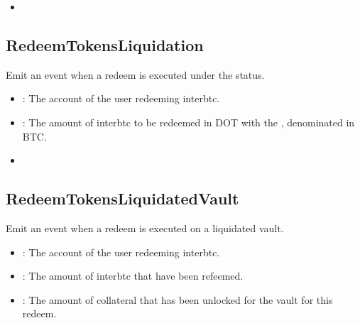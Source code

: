 \documentclass[a4paper,10pt,english]{sphinxmanual}
\begin{document}
\begin{itemize}
\item {} 
{\hyperref[\detokenize{spec/vault-registry:redeemtokens}]{}}

\end{itemize}


\subsection{RedeemTokensLiquidation}
\label{\detokenize{spec/vault-registry:id49}}
Emit an event when a redeem is executed under the  status.



\begin{itemize}
\item {} 
 : The account of the user redeeming interbtc.

\item {} 
: The amount of interbtc to be redeemed in DOT with the , denominated in BTC.

\end{itemize}

\begin{itemize}
\item {} 
{\hyperref[\detokenize{spec/vault-registry:redeemtokensliquidation}]{}}

\end{itemize}


\subsection{RedeemTokensLiquidatedVault}
\label{\detokenize{spec/vault-registry:redeemtokensliquidatedvault}}
Emit an event when a redeem is executed on a liquidated vault.



\begin{itemize}
\item {} 
 : The account of the user redeeming interbtc.

\item {} 
: The amount of interbtc that have been refeemed.

\item {} 
: The amount of collateral that has been unlocked for the vault for this redeem.

\end{itemize}
\end{document}
